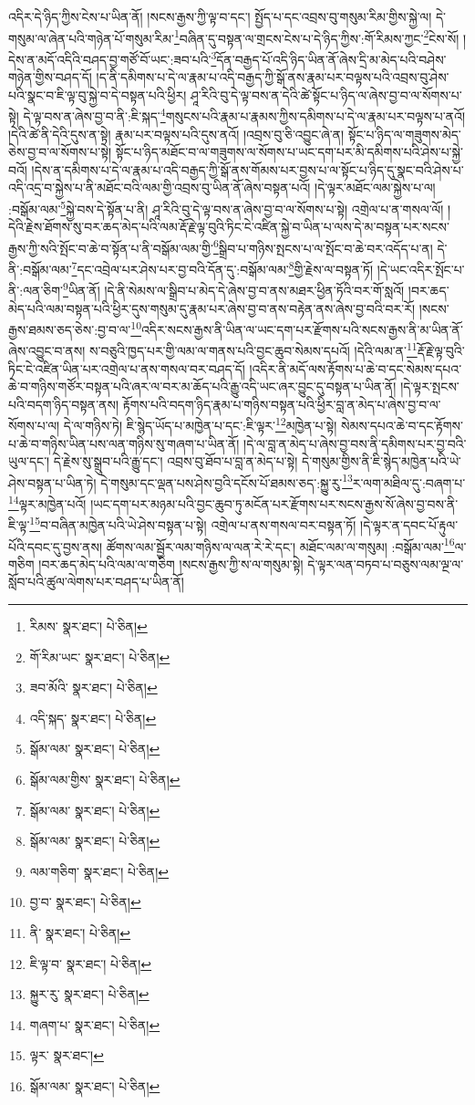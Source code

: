 འདིར་དེ་ཉིད་ཀྱིས་ངེས་པ་ཡིན་ནོ། །སངས་རྒྱས་ཀྱི་ལྟ་བ་དང་། སྤྱོད་པ་དང་འབྲས་བུ་གསུམ་རིམ་གྱིས་སྐྱེ་ལ། དེ་གསུམ་ལ་ཞེན་པའི་གཉེན་པོ་གསུམ་རིམ་\footnote{རིམས་  སྣར་ཐང་།  པེ་ཅིན། }བཞིན་དུ་བསྟན་ལ་གྲངས་ངེས་པ་དེ་ཉིད་ཀྱིས་:གོ་རིམས་ཀྱང་\footnote{གོ་རིམ་ཡང་  སྣར་ཐང་།  པེ་ཅིན། }ངེས་སོ། །དེས་ན་མདོ་འདིའི་བཤད་བྱ་གཙོ་བོ་ཡང་:ཟབ་པའི་\footnote{ཟབ་མོའི་  སྣར་ཐང་།  པེ་ཅིན། }དོན་བརྒྱད་པོ་འདི་ཉིད་ཡིན་ནོ་ཞེས་དྲི་མ་མེད་པའི་བཤེས་གཉེན་གྱིས་བཤད་དོ། །ད་ནི་དམིགས་པ་དེ་ལ་རྣམ་པ་འདི་བརྒྱད་ཀྱི་སྒོ་ནས་རྣམ་པར་བལྟས་པའི་འབྲས་བུ་ཤེས་པའི་སྣང་བ་ཇི་ལྟ་བུ་སྐྱེ་བ་དེ་བསྟན་པའི་ཕྱིར། ཤཱ་རིའི་བུ་དེ་ལྟ་བས་ན་དེའི་ཚེ་སྟོང་པ་ཉིད་ལ་ཞེས་བྱ་བ་ལ་སོགས་པ་སྟེ། དེ་ལྟ་བས་ན་ཞེས་བྱ་བ་ནི་:ཇི་སྐད་\footnote{འདི་སྐད་  སྣར་ཐང་།  པེ་ཅིན། }གསུངས་པའི་རྣམ་པ་རྣམས་ཀྱིས་དམིགས་པ་དེ་ལ་རྣམ་པར་བལྟས་པ་ནའོ། །དེའི་ཚེ་ནི་དེའི་དུས་ན་སྟེ། རྣམ་པར་བལྟས་པའི་དུས་ནའོ། །འབྲས་བུ་ཅི་འབྱུང་ཞེ་ན། སྟོང་པ་ཉིད་ལ་གཟུགས་མེད་ཅེས་བྱ་བ་ལ་སོགས་པ་སྟེ། སྟོང་པ་ཉིད་མཐོང་བ་ལ་གཟུགས་ལ་སོགས་པ་ཡང་དག་པར་མི་དམིགས་པའི་ཤེས་པ་སྐྱེ་བའོ། །དེས་ན་དམིགས་པ་དེ་ལ་རྣམ་པ་འདི་བརྒྱད་ཀྱི་སྒོ་ནས་གོམས་པར་བྱས་པ་ལ་སྟོང་པ་ཉིད་དུ་སྣང་བའི་ཤེས་པ་འདི་འདྲ་བ་སྐྱེས་པ་ནི་མཐོང་བའི་ལམ་གྱི་འབྲས་བུ་ཡིན་ནོ་ཞེས་བསྟན་པའོ། །དེ་ལྟར་མཐོང་ལམ་སྐྱེས་པ་ལ། :བསྒོམ་ལམ་\footnote{སྒོམ་ལམ་  སྣར་ཐང་།  པེ་ཅིན། }སྐྱེ་བས་དེ་སྟོན་པ་ནི། ཤཱ་རིའི་བུ་དེ་ལྟ་བས་ན་ཞེས་བྱ་བ་ལ་སོགས་པ་སྟེ། འགྲེལ་པ་ན་གསལ་ལོ། །དེའི་རྗེས་ཐོགས་སུ་བར་ཆད་མེད་པའི་ལམ་རྡོ་རྗེ་ལྟ་བུའི་ཏིང་ངེ་འཛིན་སྐྱེ་བ་ཡིན་པ་ལས་དེ་མ་བསྟན་པར་སངས་རྒྱས་ཀྱི་སའི་སྤོང་བ་ཆེ་བ་སྟོན་པ་ནི་བསྒོམ་ལམ་གྱི་\footnote{སྒོམ་ལམ་གྱིས་  སྣར་ཐང་།  པེ་ཅིན། }སྒྲིབ་པ་གཉིས་སྤངས་པ་ལ་སྤོང་བ་ཆེ་བར་འདོད་པ་ན། དེ་ནི་:བསྒོམ་ལམ་\footnote{སྒོམ་ལམ་  སྣར་ཐང་།  པེ་ཅིན། }དང་འབྲེལ་པར་ཤེས་པར་བྱ་བའི་དོན་དུ་:བསྒོམ་ལམ་\footnote{སྒོམ་ལམ་  སྣར་ཐང་།  པེ་ཅིན། }གྱི་རྗེས་ལ་བསྟན་ཏོ། །དེ་ཡང་འདིར་སྤོང་པ་ནི་:ལན་ཅིག་\footnote{ལམ་གཅིག་  སྣར་ཐང་།  པེ་ཅིན། }ཡིན་ནོ། །དེ་ནི་སེམས་ལ་སྒྲིབ་པ་མེད་དེ་ཞེས་བྱ་བ་ནས་མཐར་ཕྱིན་ཏོའི་བར་གོ་སླའོ། །བར་ཆད་མེད་པའི་ལམ་བསྟན་པའི་ཕྱིར་དུས་གསུམ་དུ་རྣམ་པར་ཞེས་བྱ་བ་ནས་བརྟེན་ནས་ཞེས་བྱ་བའི་བར་རོ། །སངས་རྒྱས་ཐམས་ཅད་ཅེས་:བྱ་བ་ལ་\footnote{བྱ་བ་  སྣར་ཐང་།  པེ་ཅིན། }འདིར་སངས་རྒྱས་ནི་ཡིན་ལ་ཡང་དག་པར་རྫོགས་པའི་སངས་རྒྱས་ནི་མ་ཡིན་ནོ་ཞེས་འབྱུང་བ་ནས། ས་བཅུའི་ཁྱད་པར་གྱི་ལམ་ལ་གནས་པའི་བྱང་ཆུབ་སེམས་དཔའོ། །དེའི་ལམ་ན་\footnote{ནི་  སྣར་ཐང་།  པེ་ཅིན། }རྡོ་རྗེ་ལྟ་བུའི་ཏིང་ངེ་འཛིན་ཡིན་པར་འགྲེལ་པ་ནས་གསལ་བར་བཤད་དོ། །འདིར་ནི་མདོ་ལས་རྟོགས་པ་ཆེ་བ་དང་སེམས་དཔའ་ཆེ་བ་གཉིས་གཙོར་བསྟན་པའི་ཞར་ལ་བར་མ་ཆོད་པའི་རྒྱུ་འདི་ཡང་ཞར་བྱུང་དུ་བསྟན་པ་ཡིན་ནོ། །དེ་ལྟར་སྤངས་པའི་བདག་ཉིད་བསྟན་ནས། རྟོགས་པའི་བདག་ཉིད་རྣམ་པ་གཉིས་བསྟན་པའི་ཕྱིར་བླ་ན་མེད་པ་ཞེས་བྱ་བ་ལ་སོགས་པ་ལ། དེ་ལ་གཉིས་ཏེ། ཇི་སྙེད་ཡོད་པ་མཁྱེན་པ་དང་:ཇི་ལྟར་\footnote{ཇི་ལྟ་བ་  སྣར་ཐང་།  པེ་ཅིན། }མཁྱེན་པ་སྟེ། སེམས་དཔའ་ཆེ་བ་དང་རྟོགས་པ་ཆེ་བ་གཉིས་ཡིན་པས་ལན་གཉིས་སུ་གཞག་པ་ཡིན་ནོ། །དེ་ལ་བླ་ན་མེད་པ་ཞེས་བྱ་བས་ནི་དམིགས་པར་བྱ་བའི་ཡུལ་དང་། དེ་རྗེས་སུ་སྒྲུབ་པའི་རྒྱུ་དང་། འབྲས་བུ་ཐོབ་པ་བླ་ན་མེད་པ་སྟེ། དེ་གསུམ་གྱིས་ནི་ཇི་སྙེད་མཁྱེན་པའི་ཡེ་ཤེས་བསྟན་པ་ཡིན་ཏེ། དེ་གསུམ་དང་ལྡན་པས་ཤེས་བྱའི་དངོས་པོ་ཐམས་ཅད་:སྐྱུ་རུ་\footnote{སྐྱུར་རུ་  སྣར་ཐང་།  པེ་ཅིན། }ར་ལག་མཐིལ་དུ་:བཞག་པ་\footnote{གཞག་པ་  སྣར་ཐང་།  པེ་ཅིན། }ལྟར་མཁྱེན་པའོ། །ཡང་དག་པར་མཉམ་པའི་བྱང་ཆུབ་ཏུ་མངོན་པར་རྫོགས་པར་སངས་རྒྱས་སོ་ཞེས་བྱ་བས་ནི་ཇི་ལྟ་\footnote{ལྟར་  སྣར་ཐང་། }བ་བཞིན་མཁྱེན་པའི་ཡེ་ཤེས་བསྟན་པ་སྟེ། འགྲེལ་པ་ནས་གསལ་བར་བསྟན་ཏོ། །དེ་ལྟར་ན་དབང་པོ་རྟུལ་པོའི་དབང་དུ་བྱས་ནས། ཚོགས་ལམ་སྦྱོར་ལམ་གཉིས་ལ་ལན་རེ་རེ་དང་། མཐོང་ལམ་ལ་གསུམ། :བསྒོམ་ལམ་\footnote{སྒོམ་ལམ་  སྣར་ཐང་།  པེ་ཅིན། }ལ་གཅིག །བར་ཆད་མེད་པའི་ལམ་ལ་གཅིག །སངས་རྒྱས་ཀྱི་ས་ལ་གསུམ་སྟེ། དེ་ལྟར་ལན་བཏབ་པ་བཅུས་ལམ་ལྔ་ལ་སློབ་པའི་ཚུལ་ལེགས་པར་བཤད་པ་ཡིན་ནོ། 